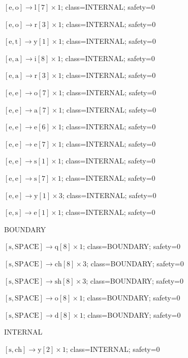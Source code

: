 \(\left[\mathrm{e}, \mathrm{o}\right] \to \mathrm{l}[7] \times 1\); class=INTERNAL; safety=0\par
\(\left[\mathrm{e}, \mathrm{o}\right] \to \mathrm{r}[3] \times 1\); class=INTERNAL; safety=0\par
\(\left[\mathrm{e}, \mathrm{t}\right] \to \mathrm{y}[1] \times 1\); class=INTERNAL; safety=0\par
\(\left[\mathrm{e}, \mathrm{a}\right] \to \mathrm{i}[8] \times 1\); class=INTERNAL; safety=0\par
\(\left[\mathrm{e}, \mathrm{a}\right] \to \mathrm{r}[3] \times 1\); class=INTERNAL; safety=0\par
\(\left[\mathrm{e}, \mathrm{e}\right] \to \mathrm{o}[7] \times 1\); class=INTERNAL; safety=0\par
\(\left[\mathrm{e}, \mathrm{e}\right] \to \mathrm{a}[7] \times 1\); class=INTERNAL; safety=0\par
\(\left[\mathrm{e}, \mathrm{e}\right] \to \mathrm{e}[6] \times 1\); class=INTERNAL; safety=0\par
\(\left[\mathrm{e}, \mathrm{e}\right] \to \mathrm{e}[7] \times 1\); class=INTERNAL; safety=0\par
\(\left[\mathrm{e}, \mathrm{e}\right] \to \mathrm{s}[1] \times 1\); class=INTERNAL; safety=0\par
\(\left[\mathrm{e}, \mathrm{e}\right] \to \mathrm{s}[7] \times 1\); class=INTERNAL; safety=0\par
\(\left[\mathrm{e}, \mathrm{e}\right] \to \mathrm{y}[1] \times 3\); class=INTERNAL; safety=0\par
\(\left[\mathrm{e}, \mathrm{s}\right] \to \mathrm{e}[1] \times 1\); class=INTERNAL; safety=0\par
BOUNDARY\par
\(\left[\mathrm{s}, \mathrm{SPACE}\right] \to \mathrm{q}[8] \times 1\); class=BOUNDARY; safety=0\par
\(\left[\mathrm{s}, \mathrm{SPACE}\right] \to \mathrm{ch}[8] \times 3\); class=BOUNDARY; safety=0\par
\(\left[\mathrm{s}, \mathrm{SPACE}\right] \to \mathrm{sh}[8] \times 3\); class=BOUNDARY; safety=0\par
\(\left[\mathrm{s}, \mathrm{SPACE}\right] \to \mathrm{o}[8] \times 1\); class=BOUNDARY; safety=0\par
\(\left[\mathrm{s}, \mathrm{SPACE}\right] \to \mathrm{d}[8] \times 1\); class=BOUNDARY; safety=0\par
INTERNAL\par
\(\left[\mathrm{s}, \mathrm{ch}\right] \to \mathrm{y}[2] \times 1\); class=INTERNAL; safety=0\par
